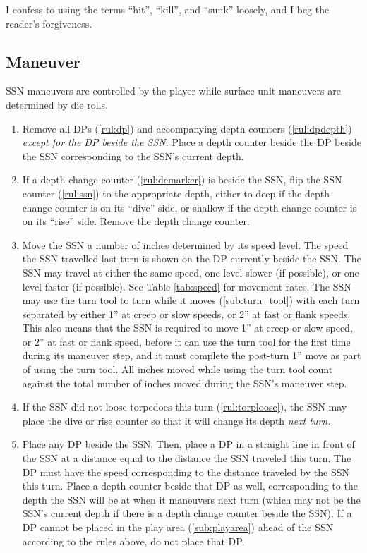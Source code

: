 \documentclass[../TacSubMicroRules.tex]{subfiles}
\begin{document}
\begin{design}
    I confess to using the terms ``hit'', ``kill'', and ``sunk'' loosely, and I beg the reader's forgiveness.
\end{design}

\subsection{Maneuver}%
\label{sub:maneuver}

SSN maneuvers are controlled by the player while surface unit maneuvers are determined by die rolls.

 
\begin{enumerate}
    \item Remove all DPs (\ref{rul:dp}) and accompanying depth counters (\ref{rul:dpdepth}) \emph{except for the DP beside the SSN.}
      Place a depth counter beside the DP beside the SSN corresponding to the SSN's current depth.
    \item If a depth change counter (\ref{rul:dcmarker}) is beside the SSN, flip the SSN counter (\ref{rul:ssn}) to the appropriate depth, either to deep if the depth change counter is on its ``dive'' side, or shallow if the depth change counter is on its ``rise'' side.
      Remove the depth change counter.
    \item Move the SSN a number of inches determined by its speed level.
      The speed the SSN travelled last turn is shown on the DP currently beside the SSN.
      The SSN may travel at either the same speed, one level slower (if possible), or one level faster (if possible).
      See Table \ref{tab:speed} for movement rates. 
      The SSN may use the turn tool to turn while it moves (\ref{sub:turn_tool}) with each turn separated by either 1'' at creep or slow speeds, or 2'' at fast or flank speeds.
      This also means that the SSN is required to move 1'' at creep or slow speed, or 2'' at fast or flank speed, before it can use the turn tool for the first time during its maneuver step, and it must complete the post-turn 1'' move as part of using the turn tool.
      All inches moved while using the turn tool count against the total number of inches moved during the SSN's maneuver step.
    \item If the SSN did not loose torpedoes this turn (\ref{rul:torploose}), the SSN may place the dive or rise counter so that it will change its depth \emph{next turn.}
    \item Place any DP beside the SSN.
      Then, place a DP in a straight line in front of the SSN at a distance equal to the distance the SSN traveled this turn.
      The DP must have the speed corresponding to the distance traveled by the SSN this turn.
      Place a depth counter beside that DP as well, corresponding to the depth the SSN will be at when it maneuvers next turn (which may not be the SSN's current depth if there is a depth change counter beside the SSN).
      If a DP cannot be placed in the play area (\ref{sub:playarea}) ahead of the SSN according to the rules above, do not place that DP.
\end{enumerate}
\end{document}
